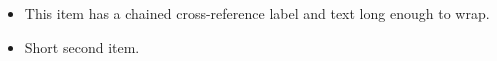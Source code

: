 \begin{itemize}
  \item \label{item:first} This item has a chained cross-reference label and text long enough to wrap.
  \item Short second item.
\end{itemize}
